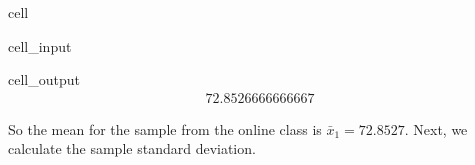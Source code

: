 \documentclass[letterpaper,10pt,english]{jupyterBook}
\begin{document}
\begin{sphinxuseclass}{cell}\begin{sphinxVerbatimInput}

\begin{sphinxuseclass}{cell_input}
\begin{sphinxVerbatim}[commandchars=\\\{\}]

\end{sphinxVerbatim}

\end{sphinxuseclass}\end{sphinxVerbatimInput}
\begin{sphinxVerbatimOutput}

\begin{sphinxuseclass}{cell_output}\begin{equation*}
\begin{split}72.8526666666667\end{split}
\end{equation*}
\end{sphinxuseclass}\end{sphinxVerbatimOutput}

\end{sphinxuseclass}
\sphinxAtStartPar
So the mean for the sample from the online class is \(\bar{x}_1 = 72.8527\). Next, we calculate the sample standard deviation.
\end{document}
